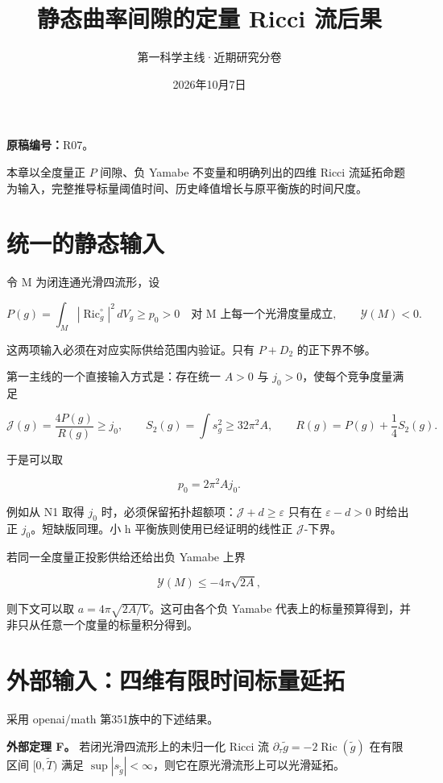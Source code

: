 \documentclass[UTF8,11pt,fontset=none]{ctexart}
\title{静态曲率间隙的定量 Ricci 流后果}
\author{第一科学主线·近期研究分卷}
\date{2026年10月7日}
\begin{document}
\maketitle
\noindent\textbf{原稿编号：}R07。

本章以全度量正 \(P\) 间隙、负 Yamabe 不变量和明确列出的四维 Ricci 流延拓命题为输入，完整推导标量阈值时间、历史峰值增长与原平衡族的时间尺度。\cite{R07,OAIFlow,Ishida}

\section{统一的静态输入}\label{ch7:ux7edfux4e00ux7684ux9759ux6001ux8f93ux5165}

令 M 为闭连通光滑四流形，设

\[
 P(g)=\int_M|\operatorname{Ric}^{\circ}_g|^2\,dV_g\ge p_0>0
 \quad\text{对 M 上每一个光滑度量成立},
 \qquad \mathcal Y(M)<0.
\]

这两项输入必须在对应实际供给范围内验证。只有 \(P+D_2\) 的正下界不够。

第一主线的一个直接输入方式是：存在统一 \(A>0\) 与 \(j_0>0\)，使每个竞争度量满足

\[
 \mathcal J(g)=\frac{4P(g)}{R(g)}\ge j_0,
 \qquad S_2(g)=\int s_g^2\ge32\pi^2A,
 \qquad R(g)=P(g)+\frac14S_2(g).
\]

于是可以取

\[
 \boxed{p_0=2\pi^2 A j_0.}
\]

例如从 N1 取得 \(j_0\) 时，必须保留拓扑超额项：\(\mathcal J+d\ge\varepsilon\) 只有在 \(\varepsilon-d>0\) 时给出正 \(j_0\)。短缺版同理。小 h 平衡族则使用已经证明的线性正 \(\mathcal J\)-下界。

若同一全度量正投影供给还给出负 Yamabe 上界

\[
 \mathcal Y(M)\le-4\pi\sqrt{2A},
\]

则下文可以取 \(a=4\pi\sqrt{2A/V}\)。这可由各个负 Yamabe 代表上的标量预算得到，并非只从任意一个度量的标量积分得到。

\section{外部输入：四维有限时间标量延拓}\label{ch7:ux5916ux90e8ux8f93ux5165ux56dbux7ef4ux6709ux9650ux65f6ux95f4ux6807ux91cfux5ef6ux62d3}

采用 openai/math 第351族中的下述结果。

\textbf{外部定理 F。} 若闭光滑四流形上的未归一化 Ricci 流 \(\partial_\tau\widetilde g=-2\operatorname{Ric}(\widetilde g)\) 在有限区间 \([0,\widetilde T)\) 满足 \(\sup|s_{\widetilde g}|<\infty\)，则它在原光滑流形上可以光滑延拓。
\end{document}
